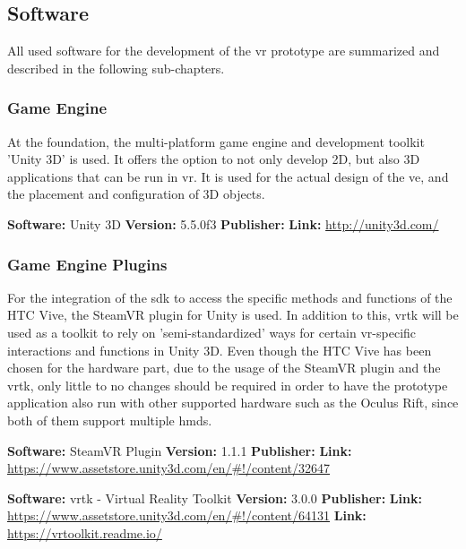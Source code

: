 
\subsection{Software}

All used software for the development of the \gls{vr} prototype are summarized and described in the following sub-chapters.


\subsubsection{Game Engine}
At the foundation, the multi-platform game engine and development toolkit 'Unity 3D' is used. It offers the option to not only develop 2D, but also 3D applications that can be run in \gls{vr}. It is used for the actual design of the \gls{ve}, and the placement and configuration of 3D objects.

\textbf{Software:} Unity 3D \newline
\textbf{Version:} 5.5.0f3 \newline
\textbf{Publisher:} \cite{Unity2016} \newline
\textbf{Link:} \url{http://unity3d.com/}


\subsubsection{Game Engine Plugins}
For the integration of the \gls{sdk} to access the specific methods and functions of the HTC Vive, the SteamVR plugin for Unity is used. In addition to this, \gls{vrtk} will be used as a toolkit to rely on 'semi-standardized' ways for certain \gls{vr}-specific interactions and functions in Unity 3D. Even though the HTC Vive has been chosen for the hardware part, due to the usage of the SteamVR plugin and the \gls{vrtk}, only little to no changes should be required in order to have the prototype application also run with other supported hardware such as the Oculus Rift, since both of them support multiple \glspl{hmd}.

\textbf{Software:} SteamVR Plugin \newline
\textbf{Version:} 1.1.1 \newline
\textbf{Publisher:} \cite{Valve2016a} \newline
\textbf{Link:} \url{https://www.assetstore.unity3d.com/en/#!/content/32647}

\textbf{Software:} \gls{vrtk} - Virtual Reality Toolkit \newline
\textbf{Version:} 3.0.0 \newline
\textbf{Publisher:} \cite{Sysdia2017} \newline
\textbf{Link:} \url{https://www.assetstore.unity3d.com/en/#!/content/64131} \newline
\textbf{Link:} \url{https://vrtoolkit.readme.io/}


